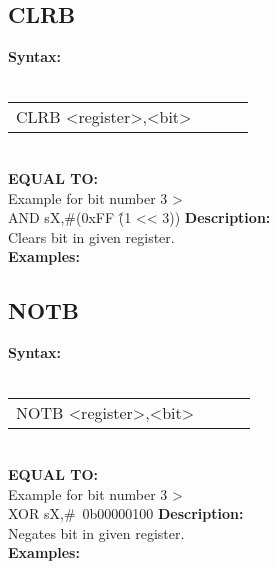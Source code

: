                 \subsection{CLRB}
                \textbf{Syntax:}\\
                \\ {
                    \texttt{}
                    \begin{tabular}[h!]{llll}
                            { \color{highlight_instruction} CLRB    } { \color{highlight_symbol} <register>,<bit> }
                            { \color{highlight_comment}  }\\
                    \end{tabular}
                    }\\
                    \textbf{EQUAL TO:}\\
                    Example for bit number 3 >\\
                    { \color{highlight_instruction} AND    } { \color{highlight_symbol}    sX,\#(0xFF \^ (1 << 3)) }
                \textbf{Description:}\\
                Clears bit in given register.\\
                \textbf{Examples:}\\
                        \begin{code}[h!]
                            symbol}\verb'CLRB          s0,#3' }\\
                        \end{code}

                \subsection{NOTB}
                \textbf{Syntax:}\\
                \\ {
                    \texttt{}
                    \begin{tabular}[h!]{llll}
                            { \color{highlight_instruction} NOTB    } { \color{highlight_symbol} <register>,<bit> }
                            { \color{highlight_comment}  }\\
                    \end{tabular}
                    }\\
                    \textbf{EQUAL TO:}\\
                    Example for bit number 3 >\\
                    { \color{highlight_instruction} XOR    } { \color{highlight_symbol}      sX,\#~0b00000100 }
                \textbf{Description:}\\
                Negates bit in given register.\\
                \textbf{Examples:}\\
                        \begin{code}[h!]
                            symbol}\verb'NOTB          s0,#3' }\\
                        \end{code}

